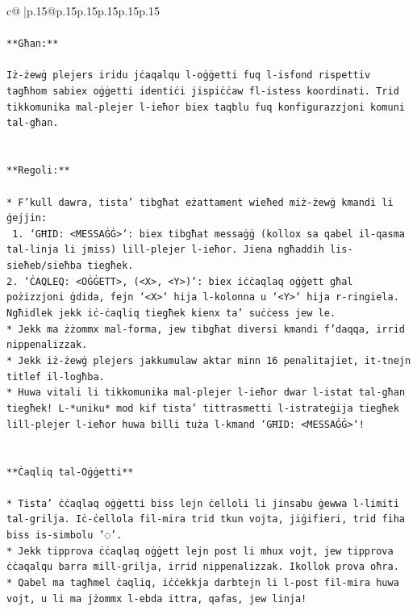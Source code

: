 \documentclass{article}
\begin{document}
{\begin{supertabular}{c@{$\;$}|p{.15\linewidth}@{}p{.15\linewidth}p{.15\linewidth}p{.15\linewidth}p{.15\linewidth}p{.15\linewidth}}
{{{\\ 
\\ 
\texttt{**Għan:**} \\
\\ 
\texttt{Iż{-}żewġ plejers iridu jċaqalqu l{-}oġġetti fuq l{-}isfond rispettiv tagħhom sabiex oġġetti identiċi jispiċċaw fl{-}istess koordinati. Trid tikkomunika mal{-}plejer l{-}ieħor biex taqblu fuq konfigurazzjoni komuni tal{-}għan.} \\
\\ 
\\ 
\texttt{**Regoli:**} \\
\\ 
\texttt{* F'kull dawra, tista' tibgħat eżattament wieħed miż{-}żewġ kmandi li ġejjin:} \\
\texttt{ 1. `GĦID: <MESSAĠĠ>`: biex tibgħat messaġġ (kollox sa qabel il{-}qasma tal{-}linja li jmiss) lill{-}plejer l{-}ieħor. Jiena ngħaddih lis{-}sieħeb/sieħba tiegħek.} \\
\texttt{2. `ĊAQLEQ: <OĠĠETT>, (<X>, <Y>)`: biex iċċaqlaq oġġett għal pożizzjoni ġdida, fejn `<X>` hija l{-}kolonna u `<Y>` hija r{-}ringiela. Ngħidlek jekk iċ{-}ċaqliq tiegħek kienx ta' suċċess jew le.} \\
\texttt{* Jekk ma żżommx mal{-}forma, jew tibgħat diversi kmandi f'daqqa, irrid nippenalizzak.} \\
\texttt{* Jekk iż{-}żewġ plejers jakkumulaw aktar minn 16 penalitajiet, it{-}tnejn titlef il{-}logħba.} \\
\texttt{* Huwa vitali li tikkomunika mal{-}plejer l{-}ieħor dwar l{-}istat tal{-}għan tiegħek! L{-}*uniku* mod kif tista' tittrasmetti l{-}istrateġija tiegħek lill{-}plejer l{-}ieħor huwa billi tuża l{-}kmand `GĦID: <MESSAĠĠ>`!} \\
\\ 
\\ 
\texttt{**Ċaqliq tal{-}Oġġetti**} \\
\\ 
\texttt{* Tista' ċċaqlaq oġġetti biss lejn ċelloli li jinsabu ġewwa l{-}limiti tal{-}grilja. Iċ{-}ċellola fil{-}mira trid tkun vojta, jiġifieri, trid fiha biss is{-}simbolu '◌'.} \\
\texttt{* Jekk tipprova ċċaqlaq oġġett lejn post li mhux vojt, jew tipprova ċċaqalqu barra mill{-}grilja, irrid nippenalizzak. Ikollok prova oħra.} \\
\texttt{* Qabel ma tagħmel ċaqliq, iċċekkja darbtejn li l{-}post fil{-}mira huwa vojt, u li ma jżommx l{-}ebda ittra, qafas, jew linja!} \\
}}}
\end{supertabular}}
\end{document}
